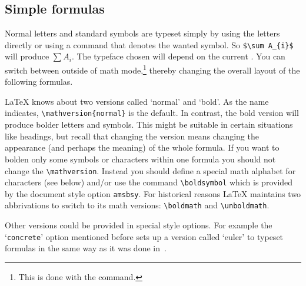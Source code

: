  \subsection{Simple formulas}

 Normal letters and standard symbols are typeset simply by using the
 letters directly or using a command that denotes the wanted symbol. So
 \verb+$\sum A_{i}$+ will produce $\sum A_{i}$. The typeface chosen
 will depend on the current . You can switch
 between  outside of math mode,\footnote{This is done
 with the command\hfil{}.}  thereby changing the overall layout of the
 following formulas.

%
%

 \LaTeX{} knows about two versions called `normal' and `bold'. As the
 name indicates, \verb+\mathversion{normal}+ is the default. In contrast,
 the bold version will produce bolder letters and symbols.  This might
 be suitable in certain situations like headings,
 but recall that changing the
 version means changing the appearance (and perhaps the meaning)
 of the whole formula.
 If you want to bolden only some symbols or characters within
 one formula you should not change the \verb=\mathversion=.
 Instead you should
 define a special math alphabet for characters
 (see below) and/or use the command \verb=\boldsymbol= which is
 provided by the document style option {\tt amsbsy}.
 For historical reasons \LaTeX{} maintains two abbrivations to switch
 to its math versions: \verb+\boldmath+ and \verb+\unboldmath+.

 Other versions could be provided in special style options. For
 example the `{\tt concrete}' option mentioned before sets up
 a version called `euler' to typeset formulas in the same way as it
 was done in~\cite{ConcreteMath}.



